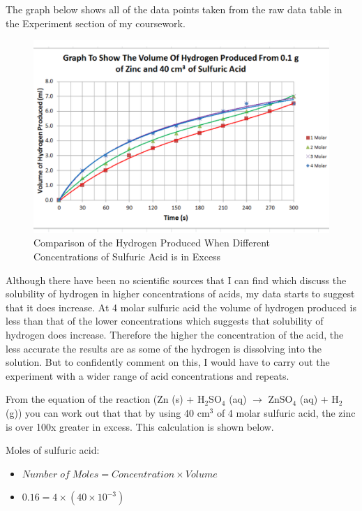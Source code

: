 The graph below shows all of the data points taken from the raw data table in the Experiment section of my coursework. 

\begin{figure}[H]
    \includegraphics[width=\textwidth]{./Analysis/Images/Solubility.pdf}
    \caption{Comparison of the Hydrogen Produced When Different Concentrations of Sulfuric Acid is in Excess} \label{fig:ComparisonCat}
\end{figure}

Although there have been no scientific sources that I can find which discuss the solubility of hydrogen in higher concentrations of acids, my data starts to suggest that it does increase. At 4 molar sulfuric acid the volume of hydrogen produced is less than that of the lower concentrations which suggests that solubility of hydrogen does increase. Therefore the higher the concentration of the acid, the less accurate the results are as some of the hydrogen is dissolving into the solution. But to confidently comment on this, I would have to carry out the experiment with a wider range of acid concentrations and repeats. 

From the equation of the reaction (Zn (s) + H$_2$SO$_4$ (aq) $\rightarrow$ ZnSO$_4$ (aq) + H$_2$ (g)) you can work out that that by using 40 cm$^3$ of 4 molar sulfuric acid, the zinc is over 100x greater in excess. This calculation is shown below.

Moles of sulfuric acid:
\begin{itemize}
\item $Number \; of \; Moles = Concentration \times Volume$
\item $0.16 = 4 \times (40 \times 10^{-3})$
\end{itemize}


